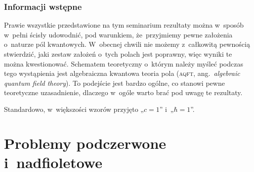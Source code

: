 \documentclass[10pt,t]{beamer}
\begin{document}
\begin{frame}
  \frametitle{Informacji wstępne}


  Prawie wszystkie przedstawione na tym seminarium rezultaty można w~sposób
  w~pełni ścisły udowodnić, \alert{pod warunkiem}, że~przyjmiemy pewne
  założenia o~naturze pól kwantowych. W~obecnej chwili nie możemy
  z~całkowitą pewnością stwierdzić, jaki zestaw założeń
  o~tych polach jest poprawny, więc wyniki te można kwestionować.
  Schematem teoretyczny o~którym należy myśleć podczas tego wystąpienia
  jest algebraiczna kwantowa teoria pola (\textsc{aqft},
  ang.~\textit{algebraic quantum field theory}). To podejście jest bardzo
  ogólne, co stanowi pewne teoretyczne uzasadnienie, dlaczego w~ogóle warto
  brać pod uwagę te rezultaty.


  Standardowo, w~większości wzorów przyjęto „$c = 1$”
  i~„\HorSpaceSeven$\hbar = 1$”.

\end{frame}










\section{Problemy podczerwone i~nadfioletowe}
\end{document}
